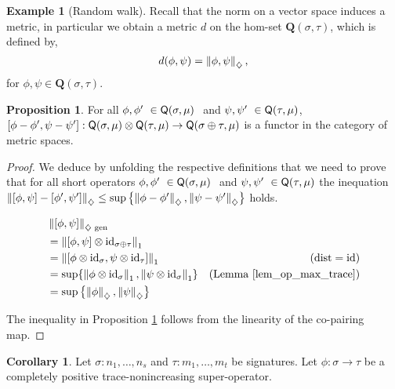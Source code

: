 \documentclass[10pt,a4paper]{amsart}
\theoremstyle{definition}
\theoremstyle{definition}
\newtheorem{example}[definition]{Example}
\theoremstyle{definition}
\theoremstyle{definition}
\newtheorem{proposition}[definition]{Proposition}
\theoremstyle{definition}
\newtheorem{corollary}[definition]{Corollary}
\theoremstyle{definition}
\begin{document}
\begin{example}[Random walk]
 Recall that the norm on a vector space induces a metric, in particular we obtain a metric $d$ on the hom-set \(\mathbf{Q}(\sigma, \tau)\),  which is defined by,
\[
d(\phi, \psi) = \left\lVert \phi, \psi \right\rVert_{\diamondsuit},
\]
for \( \phi, \psi \in \mathbf{Q}(\sigma, \tau) \).



\begin{proposition} \label{prop:met_cond}
  For all $\phi, \phi' \in \catQ(\sigma,\mu)  $ and $\psi, \psi' \in \catQ(\tau,\mu) $, $[\phi-\phi',\psi-\psi']:\mathsf{Q}(\sigma,\mu) \otimes \mathsf{Q}(\tau,\mu) \rightarrow \mathsf{Q}(\sigma \oplus \tau,\mu) $ is a functor in the category of metric spaces.
\end{proposition}



\begin{proof}
  We deduce by unfolding the respective definitions that we need to prove that for all short operators $\phi, \phi' \in \catQ(\sigma,\mu)  $ and $\psi, \psi' \in \catQ(\tau,\mu) $ the inequation $\left\lVert [\phi, \psi] - [\phi', \psi'] \right\rVert_{\diamondsuit} \leq  \sup \left\{ \left\lVert \phi-\phi' \right\rVert_{\diamondsuit}, \left\lVert \psi-\psi' \right\rVert_{\diamondsuit} \right\}$ holds.
 

    \begin{align*}
      & \left\lVert [\phi, \psi] \right\rVert_{ \diamondsuit \text{ gen}} \\
      &= \left\lVert [\phi, \psi] \otimes \mathrm{id}_{\sigma\oplus\tau} \right\rVert_{1} \\
      &= \left\lVert [\phi \otimes \mathrm{id}_\sigma, \psi \otimes \mathrm{id}_\tau] \right\rVert_{1}& (\mathrm{dist}=\mathrm{id}) \\
      & =  \sup \{ \left\lVert \phi \otimes \mathrm{id}_\sigma \right\rVert_{1}, \left\lVert \psi \otimes \mathrm{id}_\sigma \right\rVert_{1} \} & (\text{Lemma \ref{lem_op_max_trace}})\\
      & = \sup \left\{ \left\lVert \phi \right\rVert_{\diamondsuit}, \left\lVert \psi \right\rVert_{\diamondsuit} \right\}
    \end{align*}

  
The inequality in Proposition \ref{prop:met_cond} follows from the linearity of the co-pairing map.
\end{proof}


  \begin{corollary} \label{cor:gen_diamond_cptp_norm}
    Let $\sigma: n_1, \ldots, n_s$ and  $\tau: m_1, \ldots, m_t$  be signatures. Let  $\phi: \sigma  \rightarrow \tau$ be a  completely positive trace-nonincreasing super-operator. 
  \end{corollary}
  


\end{example}
\end{document}
